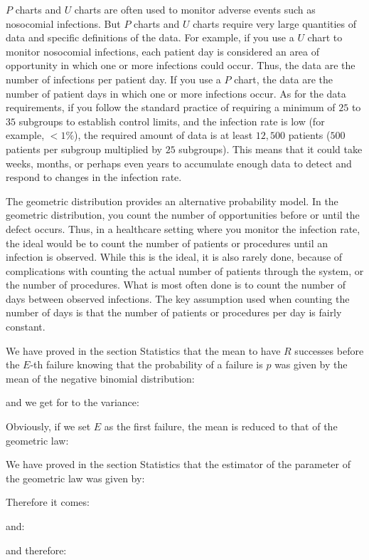 	$P$ charts and $U$ charts are often used to monitor adverse events such as nosocomial infections. But $P$ charts and $U$ charts require very large quantities of data and specific definitions of the data. For example, if you use a $U$ chart to monitor nosocomial infections, each patient day is considered an area of opportunity in which one or more infections could occur. Thus, the data are the number of infections per patient day. If you use a $P$ chart, the data are the number of patient days in which one or more infections occur. As for the data requirements, if you follow the standard practice of requiring a minimum of $25$ to $35$ subgroups to establish control limits, and the infection rate is low (for example, $< 1\%$), the required amount of data is at least $12,500$ patients ($500$ patients per subgroup multiplied by $25$ subgroups). This means that it could take weeks, months, or perhaps even years to accumulate enough data to detect and respond to changes in the infection rate.
	
	The geometric distribution provides an alternative probability model. In the geometric distribution, you count the number of opportunities before or until the defect occurs. Thus, in a healthcare setting where you monitor the infection rate, the ideal would be to count the number of patients or procedures until an infection is observed. While this is the ideal, it is also rarely done, because of complications with counting the actual number of patients through the system, or the number of procedures. What is most often done is to count the number of days between observed infections. The key assumption used when counting the number of days is that the number of
patients or procedures per day is fairly constant.

	We have proved in the section Statistics that the mean to have $R$ successes before the $E$-th failure knowing that the probability of a failure is $p$ was given by the mean of the negative binomial distribution:
	
	and we get for to the variance:
	
	Obviously, if we set $E$ as the first failure, the mean is reduced to that of the geometric law:
	
	We have proved in the section Statistics that the estimator of the parameter of the geometric law was given by:
	
	Therefore it comes:
	
	and:
	
	and therefore:
	

